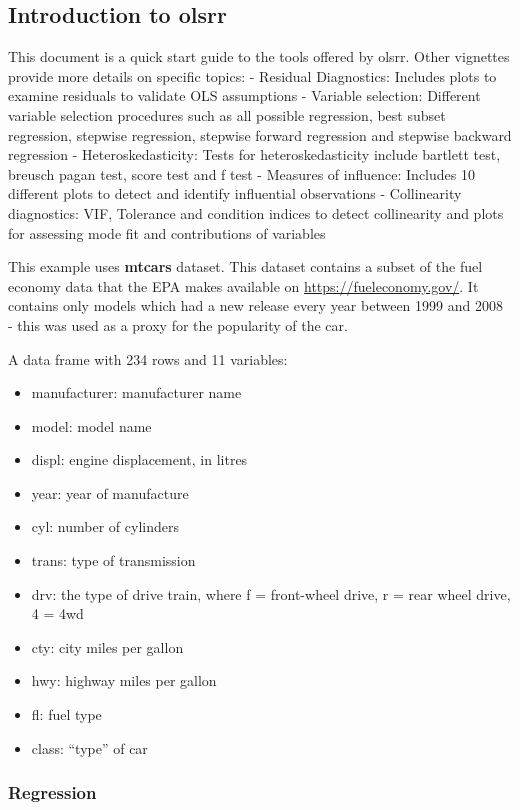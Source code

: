 \documentclass[
]{article}
\providecommand{\tightlist}{%
  \setlength{\itemsep}{0pt}\setlength{\parskip}{0pt}}
\begin{document}
\hypertarget{introduction-to-olsrr}{%
\subsection{Introduction to olsrr}\label{introduction-to-olsrr}}

This document is a quick start guide to the tools offered by olsrr.
Other vignettes provide more details on specific topics: - Residual
Diagnostics: Includes plots to examine residuals to validate OLS
assumptions - Variable selection: Different variable selection
procedures such as all possible regression, best subset regression,
stepwise regression, stepwise forward regression and stepwise backward
regression - Heteroskedasticity: Tests for heteroskedasticity include
bartlett test, breusch pagan test, score test and f test - Measures of
influence: Includes 10 different plots to detect and identify
influential observations - Collinearity diagnostics: VIF, Tolerance and
condition indices to detect collinearity and plots for assessing mode
fit and contributions of variables

This example uses \textbf{mtcars} dataset. This dataset contains a
subset of the fuel economy data that the EPA makes available on
\url{https://fueleconomy.gov/}. It contains only models which had a new
release every year between 1999 and 2008 - this was used as a proxy for
the popularity of the car.

A data frame with 234 rows and 11 variables:

\begin{itemize}
\tightlist
\item
  manufacturer: manufacturer name
\item
  model: model name
\item
  displ: engine displacement, in litres
\item
  year: year of manufacture
\item
  cyl: number of cylinders
\item
  trans: type of transmission
\item
  drv: the type of drive train, where f = front-wheel drive, r = rear
  wheel drive, 4 = 4wd
\item
  cty: city miles per gallon
\item
  hwy: highway miles per gallon
\item
  fl: fuel type
\item
  class: ``type'' of car
\end{itemize}

\hypertarget{regression}{%
\subsubsection{Regression}\label{regression}}
\end{document}
